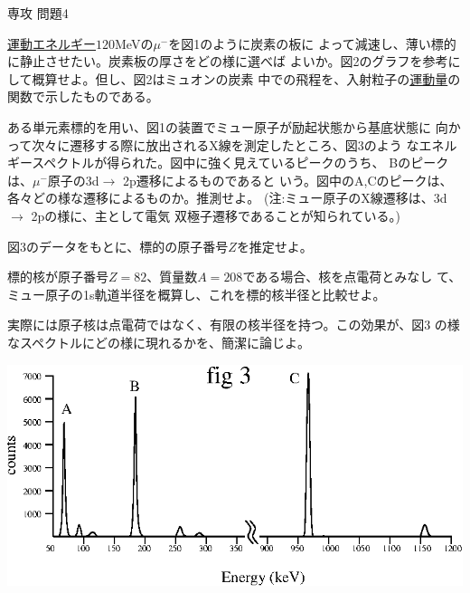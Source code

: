 \documentclass[fleqn]{jbook}
\begin{document}
\begin{question}{専攻 問題4}{}
\begin{subquestions}
\SubQuestion
  \underline{運動エネルギー}$120$MeVの$\mu^-$を図1のように炭素の板に
  よって減速し、薄い標的に静止させたい。炭素板の厚さをどの様に選べば
  よいか。図2のグラフを参考にして概算せよ。但し、図2はミュオンの炭素
  中での飛程を、入射粒子の\underline{運動量}の関数で示したものである。

\SubQuestion
  ある単元素標的を用い、図1の装置でミュー原子が励起状態から基底状態に
  向かって次々に遷移する際に放出されるX線を測定したところ、図3のよう
  なエネルギースペクトルが得られた。図中に強く見えているピークのうち、
  Bのピークは、$\mu^-$原子の3d$\rightarrow$ 2p遷移によるものであると
  いう。図中のA,Cのピークは、各々どの様な遷移によるものか。推測せよ。
  (注:ミュー原子のX線遷移は、3d$\rightarrow$ 2pの様に、主として電気
  双極子遷移であることが知られている。)\\
%
\parbox[t]{60mm}{
\SubQuestion
  図3のデータをもとに、標的の原子番号$Z$を推定せよ。

\SubQuestion
  標的核が原子番号$Z=82$、質量数$A=208$である場合、核を点電荷とみなし
  て、ミュー原子の1s軌道半径を概算し、これを標的核半径と比較せよ。

\SubQuestion
  実際には原子核は点電荷ではなく、有限の核半径を持つ。この効果が、図3
  の様なスペクトルにどの様に現れるかを、簡潔に論じよ。
}\parbox[t]{100mm}{
\begin{center}
  \mbox{\includegraphics[clip]{1995phy4-3.eps}}
\end{center}}

\end{subquestions}


\end{question}
\end{document}
